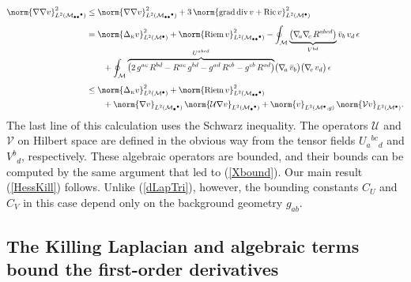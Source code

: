 \documentclass[12pt,letterpaper]{iopart}
\newcommand\Lap[1][K]{\Delta_{\scriptscriptstyle\mathrm{#1}}}
\newcommand\M{\mathcal{M}}
\newcommand\U{\mathcal{U}}
\newcommand\V{\mathcal{V}}
\newcommand\ind{{\bullet}}
\DeclareMathOperator\Ric{Ric}
\DeclareMathOperator\Riem{Riem}
\begin{document}
%
\begin{align}\label{bndHess}
	\norm{\grad \grad v}^2_{L^2(\M_{\ind\ind}{}^\ind)}
		&\le \norm{\grad \grad v}^2_{L^2(\M_{\ind\ind}{}^\ind)} 
			+ 3\, \norm{\Grad \Div v + \Ric v}^2_{L^2(\M^\ind)}
			\notag\\[1ex]
		&= \norm{\Lap v}^2_{L^2(\M^\ind)}
			+ \norm{\Riem v}^2_{L^2(\M_{\ind\ind}{}^\ind)}
			- \oint_\M \underbrace{\bigl( \grad\!_a \grad\!_c\, R^{abcd} \bigr)}_{V^{bd}}
				\bar v_b\, v_d\, \epsilon
			\notag\\[-2ex]&\hspace{2em}
			+ \oint_\M \overbrace{\bigl( 2\, g^{ac}\, R^{bd} - R^{ac}\, g^{bd} 
					- g^{ad}\, R^{cb} - g^{cb}\, R^{ad} \bigr)}^{U^{abcd}}
				\bigl( \grad\!_a\, \bar v_b \bigr) \bigl( \grad\!_c\, v_d \bigr)\, \epsilon
			\notag\\[1ex]
		&\le \norm{\Lap v}^2_{L^2(\M^\ind)} 
			+ \norm{\Riem v}^2_{L^2(\M_{\ind\ind}{}^\ind)}
			\notag\\&\hspace{2em}
			+ \norm{\grad v}_{L^2(\M_\ind{}^\ind)}\, 
				\norm{\U \grad v}_{L^2(\M_\ind{}^\ind)}
			+ \norm{v}_{L^2(\M^\ind, g)}\, \norm{\V v}_{L^2(\M^\ind)}.
\end{align}
%
The last line of this calculation uses the Schwarz inequality.  The operators $\U$ and $\V$ on Hilbert space are defined in the obvious way from the tensor fields $U_a{}^{bc}{}_d$ and $V^b{}_d$, respectively.  These algebraic operators are bounded, and their bounds can be computed by the same argument that led to (\ref{Xbound}).  Our main result (\ref{HessKill}) follows.  Unlike (\ref{dLapTri}), however, the bounding constants $C_U$ and $C_V$ in this case depend only on the background geometry $g_{ab}$.


\subsection{The Killing Laplacian and algebraic terms bound the first-order derivatives}
\label{Grad<Lap}
\end{document}
